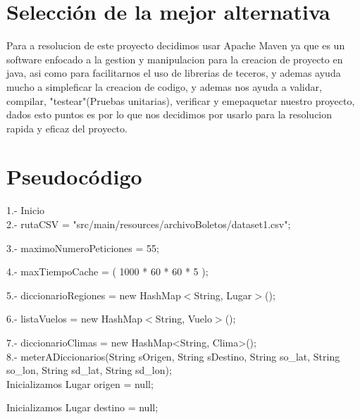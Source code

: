 \documentclass[30pt]{article}
\theoremstyle{definition}
\begin{document}
\section{Selección de la mejor alternativa}

{\large Para a resolucion de este proyecto decidimos usar Apache Maven ya que es un software enfocado a la gestion y manipulacion para la creacion de proyecto en java, asi como para facilitarnos el uso de librerias de teceros, y ademas ayuda mucho a simpleficar la creacion de codigo, y ademas nos ayuda a validar, compilar, "testear"(Pruebas unitarias), verificar y emepaquetar nuestro proyecto, dados esto puntos es por lo que nos decidimos por usarlo para la resolucion rapida y eficaz del proyecto.}\\

\newpage
\section{Pseudocódigo}

1.- Inicio\\

    \hspace{1cm} 2.- rutaCSV = "src/main/resources/archivoBoletos/dataset1.csv";
    
    \hspace{1cm} 3.- maximoNumeroPeticiones = 55;
    
    \hspace{1cm} 4.- maxTiempoCache = ( 1000 * 60 * 60 * 5 );
    
    \hspace{1cm} 5.- diccionarioRegiones = new HashMap$<$String, Lugar$>$();
    
    \hspace{1cm} 6.- listaVuelos = new HashMap$<$String, Vuelo$>$();
    
    \hspace{1cm} 7.- diccionarioClimas = new HashMap<String, Clima>();\\
    
\hspace{1cm} 8.-  meterADiccionarios(String sOrigen, String sDestino, String so\_lat, String so\_lon, String sd\_lat, String sd\_lon);\\

    
    \hspace{2cm} Inicializamos Lugar origen = null;
    
    \hspace{2cm} Inicializamos Lugar destino = null;\\
    
\end{document}
